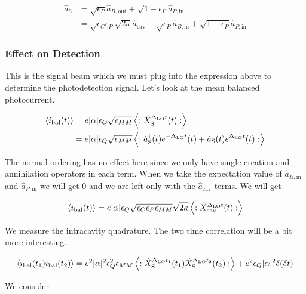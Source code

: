 \documentclass[12pt]{article}
\newcommand{\ep}{\epsilon}
\begin{document}
\begin{align}
\hat{a}_{\text{S}} &= \sqrt{\ep_P}\hat{a}_{B,\text{out}} + \sqrt{1-\ep_P}\hat{a}_{P,\text{in}}\\
&= \sqrt{\ep_C \ep_P} \sqrt{2\kappa}\hat{a}_{\text{cav}} + \sqrt{\ep_P}\hat{a}_{B,\text{in}} + \sqrt{1-\ep_P}\hat{a}_{P,\text{in}}
\end{align}

\subsubsection{Effect on Detection}

This is the signal beam which we must plug into the expression above to determine the photodetection signal. Let's look at the mean balanced photocurrent.

\begin{align}
\Braket{i_{\text{bal}}(t)} &= e|\alpha|\ep_Q \sqrt{\ep_{MM}} \Braket{:\hat{X}_{\text{S}}^{\Delta_{\text{LO}}t}(t):}\\
&= e|\alpha|\ep_Q \sqrt{\ep_{MM}} \Braket{:\hat{a}^{\dag}_{\text{S}}(t)e^{-\Delta_{\text{LO}}t}(t) + \hat{a}_{\text{S}}(t)e^{\Delta_{\text{LO}}t}(t):}
\end{align}

The normal ordering has no effect here since we only have single creation and annihilation operators in each term. When we take the expectation value of $\hat{a}_{B,\text{in}}$ and $\hat{a}_{P,\text{in}}$ we will get $0$ and we are left only with the $\hat{a}_{\text{cav}}$ terms. We will get

\begin{align}
\Braket{i_{\text{bal}}(t)} &= e|\alpha|\ep_Q \sqrt{\ep_C \ep_P \ep_{MM}} \sqrt{2\kappa} \Braket{:\hat{X}_{\text{cav}}^{\Delta_{\text{LO}}t}(t):}\\
\end{align}

We measure the intracavity quadrature. The two time correlation will be a bit more interesting.

\begin{align}
\Braket{i_{\text{bal}}(t_1)i_{\text{bal}}(t_2)} = e^2 |\alpha|^2 \ep_Q^2 \ep_{MM} \Braket{:\hat{X}_{\text{S}}^{\Delta_{\text{LO}}t_1}(t_1)\hat{X}_{\text{S}}^{\Delta_{\text{LO}}t_2}(t_2) :} + e^2 \ep_Q |\alpha|^2 \delta(\delta t)
\end{align}

We consider
\end{document}
